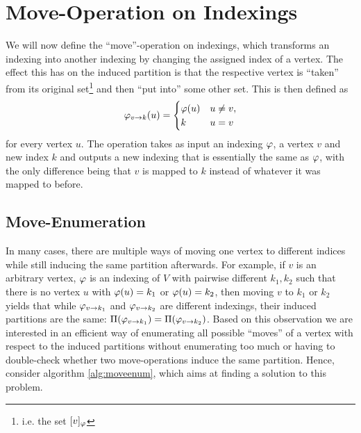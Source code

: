 \section{Move-Operation on Indexings}

We will now define the ``move''-operation on indexings, which transforms an indexing into another indexing by changing the assigned index of a vertex. The effect this has on the induced partition is that the respective vertex is ``taken'' from its original set\footnote{i.e. the set $[v]_\varphi$} and then ``put into'' some other set. This is then defined as
\begin{equation} 
\varphi_{ v\rightarrow  k}(u) = \begin{cases}
    \varphi(u) & u \neq v, \\ 
    k & u = v
\end{cases} \label{eq:move-operation}
\end{equation} 
for every vertex $u$. The operation takes as input an indexing $\varphi$, a vertex $v$ and new index $k$ and outputs a new indexing that is essentially the same as $\varphi$, with the only difference being that $v$ is mapped to $k$ instead of whatever it was mapped to before.

\subsection{Move-Enumeration}

In many cases, there are multiple ways of moving one vertex to different indices while still inducing the same partition afterwards. For example, if $v$ is an arbitrary vertex, $\varphi$ is an indexing of $V$ with pairwise different $k_1,k_2$ such that there is no vertex $u$ with $\varphi(u) = k_1$ or $\varphi(u) = k_2$, then moving $v$ to $k_1$ or $k_2$ yields that while $\varphi_{v\rightarrow k_1}$ and $\varphi_{v\rightarrow k_2}$ are different indexings, their induced partitions are the same: $\Pi(\varphi_{v\rightarrow k_1}) = \Pi(\varphi_{v\rightarrow k_2})$. Based on this observation we are interested in an efficient way of enumerating all possible ``moves'' of a vertex with respect to the induced partitions without enumerating too much or having to double-check whether two move-operations induce the same partition. Hence, consider algorithm \ref{alg:moveenum}, which aims at finding a solution to this problem.

